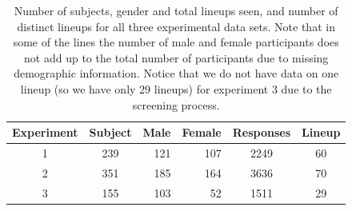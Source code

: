 \documentclass{article}
\newcommand{\blue}[1]{{\color{blue} #1}} %
\newcommand{\hh}[1]{{\color{orange} #1}} %
\begin{document}

\begin{table}[hbtp]
\caption{Number of subjects, gender and total lineups seen, and number of distinct lineups for all three experimental data sets. Note that in some of the lines the number of male and female participants does not add up to the total number of participants due to missing demographic information. \blue{Notice that we do not have data on one lineup (so we have only 29 lineups) for experiment 3 due to the screening process.}}
\begin{center}
\begin{tabular}{ccrrcc}
   \hline 
 Experiment & Subject & Male & Female & Responses &Lineup\\ 
    \hline
1 & 239 & 121 & 107 & 2249 &  60 \\ 
  2 & 351 & 185 & 164 & 3636 &  70 \\ 
  3 & 155 & 103 &  52 & 1511 &  29 \\  
   \hline
\end{tabular}
\end{center}
\label{tbl:summary}
\end{table}
\end{document}
